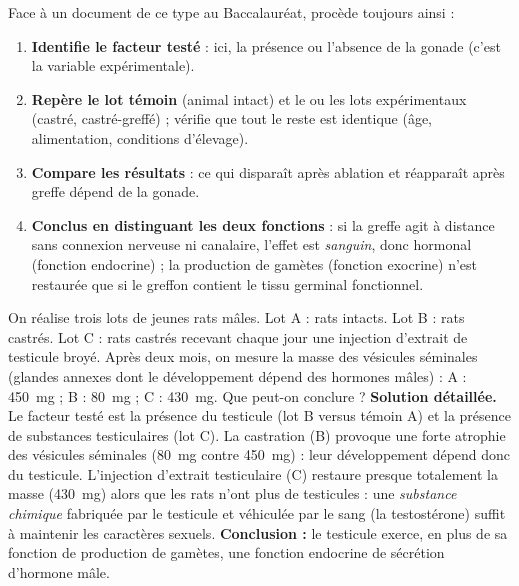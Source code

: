 \documentclass[11pt]{article}
\begin{document}
\begin{methode}
Face à un document de ce type au Baccalauréat, procède toujours ainsi :
\begin{enumerate}
\item \textbf{Identifie le facteur testé} : ici, la présence ou l'absence de la gonade (c'est la variable expérimentale).
\item \textbf{Repère le lot témoin} (animal intact) et le ou les lots expérimentaux (castré, castré-greffé) ; vérifie que tout le reste est identique (âge, alimentation, conditions d'élevage).
\item \textbf{Compare les résultats} : ce qui disparaît après ablation et réapparaît après greffe dépend de la gonade.
\item \textbf{Conclus en distinguant les deux fonctions} : si la greffe agit à distance sans connexion nerveuse ni canalaire, l'effet est \emph{sanguin}, donc hormonal (fonction endocrine) ; la production de gamètes (fonction exocrine) n'est restaurée que si le greffon contient le tissu germinal fonctionnel.
\end{enumerate}
\end{methode}

\begin{exoresolu}
On réalise trois lots de jeunes rats mâles. Lot A : rats intacts. Lot B : rats castrés. Lot C : rats castrés recevant chaque jour une injection d'extrait de testicule broyé. Après deux mois, on mesure la masse des vésicules séminales (glandes annexes dont le développement dépend des hormones mâles) : A : \SI{450}{mg} ; B : \SI{80}{mg} ; C : \SI{430}{mg}. Que peut-on conclure ?
\tcblower
\textbf{Solution détaillée.} Le facteur testé est la présence du testicule (lot B versus témoin A) et la présence de substances testiculaires (lot C). La castration (B) provoque une forte atrophie des vésicules séminales (\SI{80}{mg} contre \SI{450}{mg}) : leur développement dépend donc du testicule. L'injection d'extrait testiculaire (C) restaure presque totalement la masse (\SI{430}{mg}) alors que les rats n'ont plus de testicules : une \emph{substance chimique} fabriquée par le testicule et véhiculée par le sang (la testostérone) suffit à maintenir les caractères sexuels. \textbf{Conclusion :} le testicule exerce, en plus de sa fonction de production de gamètes, une fonction endocrine de sécrétion d'hormone mâle.
\end{exoresolu}
\end{document}
